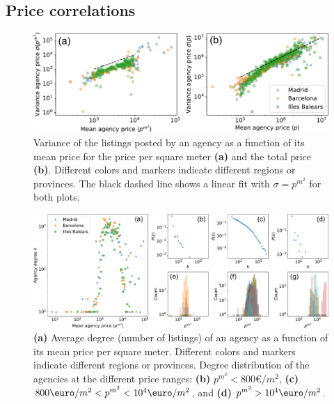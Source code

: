 \subsection{Price correlations}

\begin{figure}
    \label{fig:sigma_price}
    \centering
    \includegraphics[width =\textwidth]{Figs/Idealista_dynamics/labeled_sigma_price.pdf}
	\caption[Variance of the agency price vs mean agency price.]{Variance of the listings posted by an agency as a function of its mean price for the price per square meter \textbf{(a)} and the total price \textbf{(b)}. Different colors and markers indicate different regions or provinces. The black dashed line shows a linear fit with $\sigma = p^{{m}^2}$ for both plots.}
\end{figure}

\begin{figure}
    \label{fig:panel_price}
    \centering
    \includegraphics[width =\textwidth]{Figs/Idealista_dynamics/panel_price.pdf}
	\caption[Price segmentation by the degree.]{\textbf{(a)} Average degree (number of listings) of an agency as a function of its mean price per square meter. Different colors and markers indicate different regions or provinces. Degree distribution of the agencies at the different price ranges: \textbf{(b)} $p^{{m}^2} < 800 \euro / m^2$, \textbf{(c)} $800 \textup{\euro}  / m^2 < p^{{m}^2} < 10^4 \textup{\euro}  / m^2$, and \textbf{(d)} $p^{{m}^2} > 10^4 \textup{\euro}  / m^2$.}
\end{figure}


